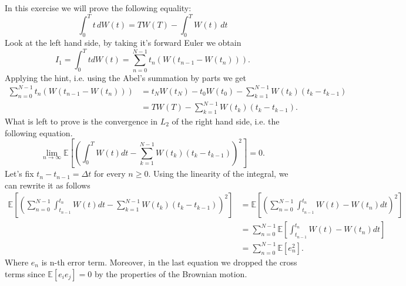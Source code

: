 \documentclass[a4paper,12pt]{article} %
\begin{document}
\subsection{}
In this exercise we will prove the following equality:
\begin{equation}
    \int_0^T t \, dW(t) = T W(T) - \int_0^T W(t) \, dt
\end{equation}
Look at the left hand side, by taking it's forward Euler we obtain
\begin{equation}
    I_1 = \int _0^T t dW(t) = \sum_{n=0}^{N-1} t_n (W(t_{n-1} -W(t_n) )).
\end{equation}
Applying the hint, i.e. using the Abel's summation by parts we get
\begin{align*}
    \sum_{n=0}^{N-1} t_n (W(t_{n-1} -W(t_n) )) & = t_N W(t_N) - t_0 W(t_0) - \sum_{k=1}^{N-1} W(t_k) (t_k - t_{k-1}) \\
                                               & = T W(T)  - \sum_{k=1}^{N-1} W(t_k) (t_k - t_{k-1}).
\end{align*}
What is left to prove is the convergence in \(L_2\) of the right hand side, i.e. the following equation.
\begin{equation}
    \lim_{n \to \infty} \mathbb{E} \left[ \left(   \int _0^T W(t)dt-\sum_{k=1}^{N-1} W(t_k) (t_k - t_{k-1})  \right)^2\right] =0.
\end{equation}
Let's fix \(t_n - t_{n-1} = \Delta t\) for every \(n\geq 0\).
Using the linearity of the integral, we can rewrite it as follows
\begin{align*}
    \mathbb{E} \left[ \left( \sum_{n=0}^{N-1}  \int _{t_{n-1}}^{t_n} W(t)dt-\sum_{k=1}^{N-1} W(t_k) (t_k - t_{k-1}) \right) ^2  \right] & = \mathbb{E} \left[ \left(   \sum_{n=0}^{N-1}  \int _{t_{n-1}}^{t_n} W(t)-W(t_n)dt  \right)^2 \right] \\
                                                                                                                                        & =\sum_{n=0}^{N-1} \mathbb{E} \left[  \int _{t_{n-1}}^{t_n} W(t)-W(t_n) dt \right]                     \\
                                                                                                                                        & = \sum_{n=0}^{N-1} \mathbb{E} \left[  e_n ^2 \right].
\end{align*}
Where \(e_n\) is n-th error term. Moreover, in the last equation we dropped the cross terms  since \(\mathbb{E} \left[ e_i e_j \right] = 0 \) by the properties of the Brownian motion.
\end{document}
